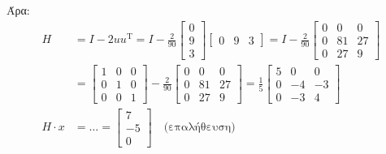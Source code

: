 \documentclass[11pt,a4paper,notitlepage,fleqn]{article}
\begin{document}
Άρα:
\begin{align*}
	H &= I-2uu^{\mathrm T} = I - \frac{2}{90}\left[\begin{matrix}
	0\\9\\3
	\end{matrix}\right]\left[\begin{matrix}
	0&9&3
	\end{matrix}\right] = I-\frac{2}{90}\left[\begin{matrix}
	0&0&0\\0&81&27\\0&27&9
	\end{matrix}\right] \\ &= \left[\begin{matrix}
	1&0&0\\0&1&0\\0&0&1
	\end{matrix}\right] - \frac{2}{90}\left[\begin{matrix}
	0&0&0\\0&81&27\\0&27&9
	\end{matrix}\right] = \frac{1}{5}\left[\begin{matrix}
	5&0&0\\0&-4&-3\\0&-3&4
	\end{matrix}\right] \\
	H\cdot x &= \dots = \left[\begin{matrix}
	7\\-5\\0
	\end{matrix}\right] \quad \text{(επαλήθευση)}
\end{align*}
\end{document}
